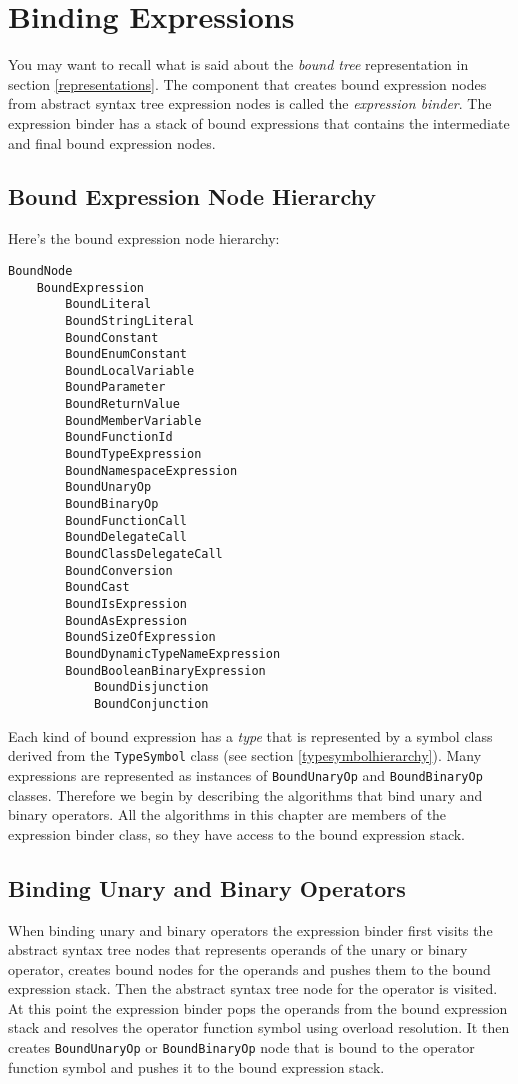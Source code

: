 \documentclass[a4paper,oneside,11pt]{book}
\theoremstyle{definition}
\begin{document}
\chapter{Binding Expressions}

You may want to recall what is said about the \emph{bound tree} representation in section \ref{representations}.
The component that creates bound expression nodes from abstract syntax tree expression nodes is called the \emph{expression binder}.
The expression binder has a stack of bound expressions that contains the intermediate and final bound expression nodes.

\section{Bound Expression Node Hierarchy}

Here's the bound expression node hierarchy:

\begin{verbatim}
BoundNode
    BoundExpression
        BoundLiteral
        BoundStringLiteral
        BoundConstant
        BoundEnumConstant
        BoundLocalVariable
        BoundParameter
        BoundReturnValue
        BoundMemberVariable
        BoundFunctionId
        BoundTypeExpression
        BoundNamespaceExpression
        BoundUnaryOp
        BoundBinaryOp
        BoundFunctionCall
        BoundDelegateCall
        BoundClassDelegateCall
        BoundConversion
        BoundCast
        BoundIsExpression
        BoundAsExpression
        BoundSizeOfExpression
        BoundDynamicTypeNameExpression
        BoundBooleanBinaryExpression
            BoundDisjunction
            BoundConjunction
\end{verbatim}

Each kind of bound expression has a \emph{type} that is represented by a symbol class derived from the \verb|TypeSymbol| class
(see section \ref{typesymbolhierarchy}).
Many expressions are represented as instances of \verb|BoundUnaryOp| and \verb|BoundBinaryOp| classes.
Therefore we begin by describing the algorithms that bind unary and binary operators.
All the algorithms in this chapter are members of the expression binder class, so they have access to the bound expression stack.

\section{Binding Unary and Binary Operators}

When binding unary and binary operators the expression binder first visits the abstract syntax tree nodes that represents operands of the unary or binary operator,
creates bound nodes for the operands and pushes them to the bound expression stack. Then the abstract syntax tree node for the operator is visited.
At this point the expression binder pops the operands from the bound expression stack and resolves the operator function symbol using overload resolution.
It then creates \verb|BoundUnaryOp| or \verb|BoundBinaryOp| node that is bound to the operator function symbol and pushes it to the bound expression stack.
\end{document}
